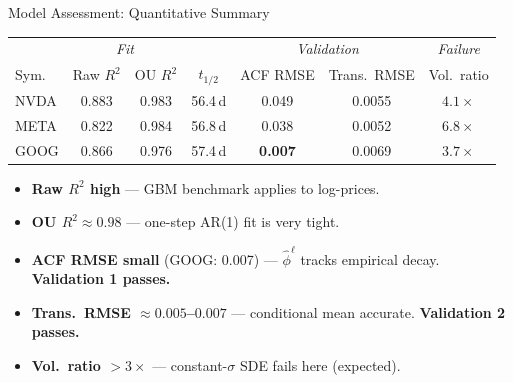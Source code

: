 \documentclass[aspectratio=169,10pt]{beamer}
\begin{document}
\begin{frame}{Model Assessment: Quantitative Summary}

\begin{center}
\small\renewcommand{\arraystretch}{1.1}
\begin{tabular}{l|cc|c|cc|c}
\toprule
 & \multicolumn{2}{c|}{\textit{Fit}} & &
   \multicolumn{2}{c|}{\textit{Validation}} & \textit{Failure} \\
Sym. & Raw $R^2$ & OU $R^2$ & $t_{1/2}$ & ACF RMSE & Trans.\ RMSE & Vol.\ ratio \\
\midrule
\rowcolor{lightgray}
NVDA & 0.883 & 0.983 & 56.4\,d & 0.049 & 0.0055 & $4.1\times$ \\
META & 0.822 & 0.984 & 56.8\,d & 0.038 & 0.0052 & $6.8\times$ \\
\rowcolor{lightgray}
GOOG & 0.866 & 0.976 & 57.4\,d & \textbf{0.007} & 0.0069 & $3.7\times$ \\
\bottomrule
\end{tabular}
\end{center}

\smallskip\small
\begin{itemize}\setlength{\itemsep}{0pt}
  \item \textbf{Raw $R^2$ high} --- GBM benchmark applies to log-prices.
  \item \textbf{OU $R^2 \approx 0.98$} --- one-step AR(1) fit is very tight.
  \item \textbf{ACF RMSE small} (GOOG: 0.007) --- $\hat\phi^\ell$ tracks empirical decay. \textbf{Validation 1 passes.}
  \item \textbf{Trans.\ RMSE $\approx 0.005$--$0.007$} --- conditional mean accurate. \textbf{Validation 2 passes.}
  \item \textbf{Vol.\ ratio $> 3\times$} --- constant-$\sigma$ SDE fails here (expected).
\end{itemize}

\end{frame}
\end{document}
